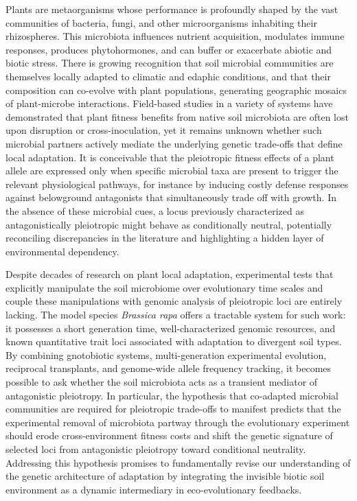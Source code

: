 \documentclass{article}
\begin{document}
Plants are metaorganisms whose performance is profoundly shaped by the vast communities of bacteria, fungi, and other microorganisms inhabiting their rhizospheres. This microbiota influences nutrient acquisition, modulates immune responses, produces phytohormones, and can buffer or exacerbate abiotic and biotic stress. There is growing recognition that soil microbial communities are themselves locally adapted to climatic and edaphic conditions, and that their composition can co-evolve with plant populations, generating geographic mosaics of plant-microbe interactions. Field-based studies in a variety of systems have demonstrated that plant fitness benefits from native soil microbiota are often lost upon disruption or cross-inoculation, yet it remains unknown whether such microbial partners actively mediate the underlying genetic trade-offs that define local adaptation. It is conceivable that the pleiotropic fitness effects of a plant allele are expressed only when specific microbial taxa are present to trigger the relevant physiological pathways, for instance by inducing costly defense responses against belowground antagonists that simultaneously trade off with growth. In the absence of these microbial cues, a locus previously characterized as antagonistically pleiotropic might behave as conditionally neutral, potentially reconciling discrepancies in the literature and highlighting a hidden layer of environmental dependency.

Despite decades of research on plant local adaptation, experimental tests that explicitly manipulate the soil microbiome over evolutionary time scales and couple these manipulations with genomic analysis of pleiotropic loci are entirely lacking. The model species \textit{Brassica rapa} offers a tractable system for such work: it possesses a short generation time, well-characterized genomic resources, and known quantitative trait loci associated with adaptation to divergent soil types. By combining gnotobiotic systems, multi-generation experimental evolution, reciprocal transplants, and genome-wide allele frequency tracking, it becomes possible to ask whether the soil microbiota acts as a transient mediator of antagonistic pleiotropy. In particular, the hypothesis that co-adapted microbial communities are required for pleiotropic trade-offs to manifest predicts that the experimental removal of microbiota partway through the evolutionary experiment should erode cross-environment fitness costs and shift the genetic signature of selected loci from antagonistic pleiotropy toward conditional neutrality. Addressing this hypothesis promises to fundamentally revise our understanding of the genetic architecture of adaptation by integrating the invisible biotic soil environment as a dynamic intermediary in eco-evolutionary feedbacks.
\end{document}
